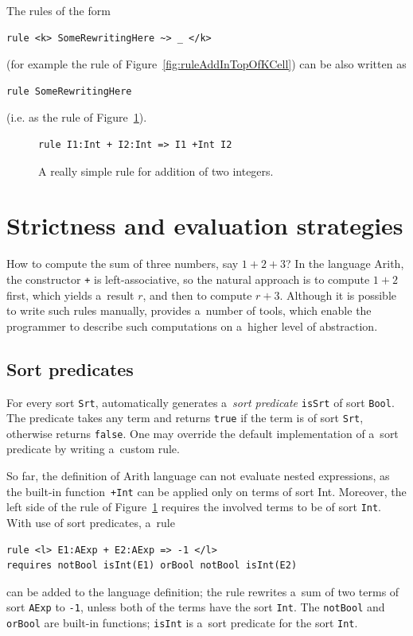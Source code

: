 \documentclass[nolot,nolof,nocover,printed]{fithesis3}
\begin{document}

The rules of the form
\begin{lstlisting}
rule <k> SomeRewritingHere ~> _ </k>
\end{lstlisting}
(for example the rule of Figure~\ref{fig:ruleAddInTopOfKCell}) can be also written as
\begin{lstlisting}
rule SomeRewritingHere
\end{lstlisting}
(i.e. as the rule of Figure~\ref{fig:simpleAdd}).

\begin{figure}[ht]
\begin{lstlisting}
rule I1:Int + I2:Int => I1 +Int I2
\end{lstlisting}
\caption{A really simple rule for addition of two integers.}
\label{fig:simpleAdd}
\end{figure}

\section{Strictness and evaluation strategies} \label{sec:k:strictness}

How to compute the sum of three numbers, say $1 + 2 + 3$? In the language Arith, the constructor \lstinline|+| is left-associative, so the natural approach is to compute $1 + 2$ first, which yields a~result $r$, and then to compute $r + 3$. Although it is possible to write such rules manually, \K provides a~number of tools, which enable the programmer to describe such computations on a~higher level of abstraction.

\subsection{Sort predicates}

For every sort \lstinline|Srt|, \K automatically generates a~\textit{sort predicate} \lstinline|isSrt| of sort \lstinline|Bool|. The predicate takes any term and returns \lstinline|true| if the term is of sort \lstinline|Srt|, otherwise returns \lstinline|false|. One may override the default implementation of a~sort predicate by writing a~custom rule.

So far, the definition of Arith language can not evaluate nested expressions, as the built-in function~\lstinline|+Int| can be applied only on terms of sort Int. Moreover, the left side of the rule of Figure~\ref{fig:simpleAdd} requires the involved terms to be of sort \lstinline|Int|. With use of sort predicates, a~rule
\begin{lstlisting}
rule <l> E1:AExp + E2:AExp => -1 </l>
requires notBool isInt(E1) orBool notBool isInt(E2)
\end{lstlisting}
can be added to the language definition; the rule rewrites a~sum of two terms of sort \lstinline|AExp| to \lstinline|-1|, unless both of the terms have the sort \lstinline|Int|. The \lstinline|notBool| and \lstinline|orBool| are built-in functions; \lstinline|isInt| is a~sort predicate for the sort \lstinline|Int|.
\end{document}
